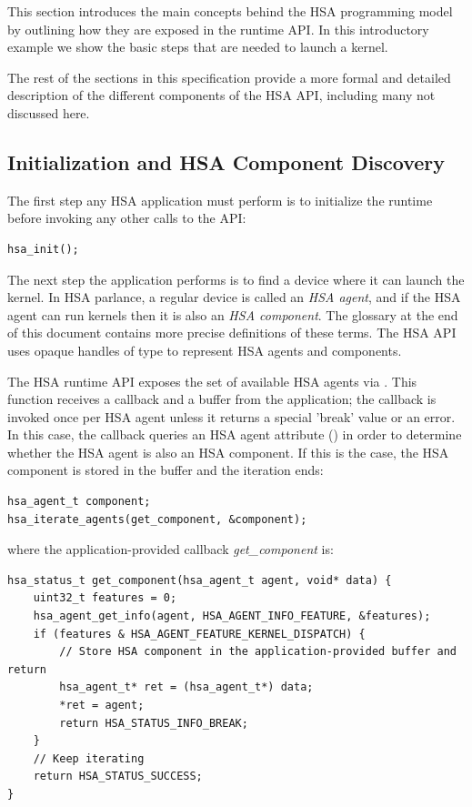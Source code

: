 \documentclass[final,oneside]{book}
\begin{document}
This section introduces the main concepts behind the HSA programming model by
outlining how they are exposed in the runtime API. In this introductory example
we show the basic steps that are needed to launch a kernel.

The rest of the sections in this specification provide a more formal and
detailed description of the different components of the HSA API, including many
not discussed here.

\subsection{Initialization and HSA Component Discovery}
The first step any HSA application must perform is to initialize the runtime
before invoking any other calls to the API:
\begin{lstlisting}
hsa_init();
\end{lstlisting}
The next step the application performs is to find a device where it can launch
the kernel. In HSA parlance, a regular device is called an \emph{HSA agent}, and if
the HSA agent can run kernels then it is also an \emph{HSA component}. The glossary at
the end of this document contains more precise definitions of these terms. The
HSA API uses opaque handles of type  to represent HSA agents and
components.

The HSA runtime API exposes the set of available HSA agents via
. This function receives a callback and a buffer from
the application; the callback is invoked once per HSA agent unless it returns a
special 'break' value or an error. In this case, the callback queries an HSA
agent attribute () in order to determine whether
the HSA agent is also an HSA component. If this is the case, the HSA component
is stored in the buffer and the iteration ends:

\begin{lstlisting}
hsa_agent_t component;
hsa_iterate_agents(get_component, &component);
\end{lstlisting}
where the application-provided callback \textit{get_component} is:
\begin{lstlisting}
hsa_status_t get_component(hsa_agent_t agent, void* data) {
    uint32_t features = 0;
    hsa_agent_get_info(agent, HSA_AGENT_INFO_FEATURE, &features);
    if (features & HSA_AGENT_FEATURE_KERNEL_DISPATCH) {
        // Store HSA component in the application-provided buffer and return
        hsa_agent_t* ret = (hsa_agent_t*) data;
        *ret = agent;
        return HSA_STATUS_INFO_BREAK;
    }
    // Keep iterating
    return HSA_STATUS_SUCCESS;
}
\end{lstlisting}
\end{document}
